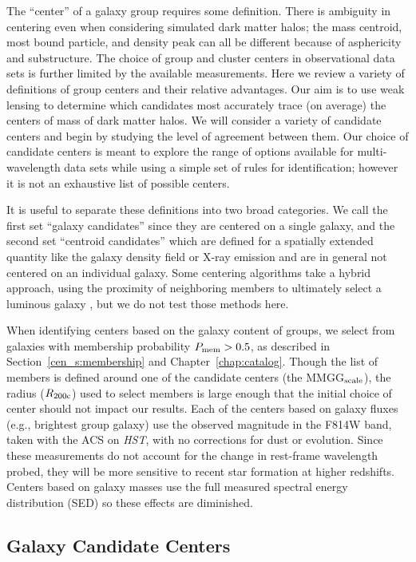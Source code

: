 The ``center'' of a galaxy group requires some definition. There is
ambiguity in centering even when considering simulated dark matter
halos; the mass centroid, most bound particle, and density peak can
all be different because of asphericity and substructure. The
choice of group and cluster centers in observational data sets is
further limited by the available measurements. Here we review a
variety of definitions of group centers and their relative advantages.
Our aim is to use weak lensing to determine which candidates most
accurately trace (on average) the centers of mass of dark matter halos. We
will consider a variety of candidate centers and begin by studying the
level of agreement between them. Our choice of candidate centers is
meant to explore the range of options available for multi-wavelength
data sets while using a simple set of rules for identification;
however it is not an exhaustive list of possible centers.
 
It is useful to separate these definitions into two broad
categories. We call the first set ``galaxy candidates'' since they are
centered on a single galaxy, and the second set ``centroid
candidates'' which are defined for a spatially extended quantity like
the galaxy density field or X-ray emission and are in general not centered on an
individual galaxy. Some centering algorithms take a hybrid
approach, using the proximity of neighboring members to
ultimately select a luminous galaxy \citep[e.g.,][]{Robotham2011}, but we do
not test those methods here.

When identifying centers based on the galaxy content of groups, we
select from galaxies with membership probability $P_{\rm mem}>0.5$, as
described in Section~\ref{cen_s:membership} and Chapter~\ref{chap:catalog}. Though the list of
members is defined around one of the candidate centers (the MMGG$_{\rm
  scale}$), the radius ($R_{\rm 200c}$) used to select members is
large enough that the initial choice of center should not impact our
results. Each of the centers based on galaxy fluxes (e.g., brightest
group galaxy) use the observed magnitude in the F814W band, taken with
the ACS on \textit{HST}, with no corrections for dust or evolution. Since
these measurements do not account for the change in rest-frame
wavelength probed, they will be more sensitive to recent star
formation at higher redshifts. Centers based on galaxy masses use the
full measured spectral energy distribution (SED) so these effects are diminished.

\subsection{Galaxy Candidate Centers}
\label{cen_s:gal_cand}

